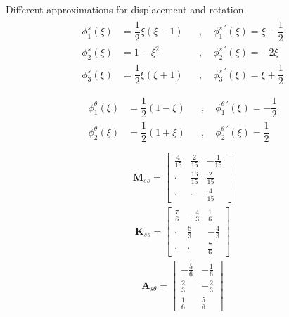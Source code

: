 \documentclass[letterpaper,10pt,english]{jupyterBook}
\begin{document}
\sphinxAtStartPar
Different approximations for displacement and rotation
\begin{equation*}
\begin{split}\begin{aligned}
  \phi^s_1(\xi) & = \dfrac{1}{2} \xi ( \xi - 1 ) && , \quad \phi^{s \ '}_1(\xi) = \xi - \dfrac{1}{2} \\
  \phi^s_2(\xi) & = 1 - \xi^2                    && , \quad \phi^{s \ '}_2(\xi) = - 2 \xi \\
  \phi^s_3(\xi) & = \dfrac{1}{2} \xi ( \xi + 1 ) && , \quad \phi^{s \ '}_3(\xi) = \xi + \dfrac{1}{2} \\
\end{aligned}\end{split}
\end{equation*}\begin{equation*}
\begin{split}\begin{aligned}
  \phi^\theta_1(\xi) & = \dfrac{1}{2} ( 1 - \xi ) && , \quad \phi^{\theta \ '}_1(\xi) = - \dfrac{1}{2} \\
  \phi^\theta_2(\xi) & = \dfrac{1}{2} ( 1 + \xi ) && , \quad \phi^{\theta \ '}_2(\xi) =   \dfrac{1}{2} \\
\end{aligned}\end{split}
\end{equation*}\begin{equation*}
\begin{split}\mathbf{M}_{ss} = \begin{bmatrix} 
\frac{4}{15} & \frac{2 }{15} & -\frac{1}{15} \\
\cdot        & \frac{16}{15} &  \frac{2}{15} \\
\cdot        & \cdot         &  \frac{4}{15}
\end{bmatrix}\end{split}
\end{equation*}\begin{equation*}
\begin{split}\mathbf{K}_{ss} = \begin{bmatrix} 
\frac{7}{6} & -\frac{4}{3} &  \frac{1}{6} \\
\cdot       &  \frac{8}{3} & -\frac{4}{3} \\
\cdot       & \cdot        &  \frac{7}{6}
\end{bmatrix}\end{split}
\end{equation*}\begin{equation*}
\begin{split}\mathbf{A}_{s\theta} = \begin{bmatrix} 
 -\frac{5}{6} & -\frac{1}{6} \\
  \frac{2}{3} & -\frac{2}{3} \\
  \frac{1}{6} &  \frac{5}{6}       
\end{bmatrix}\end{split}
\end{equation*}
\end{document}
